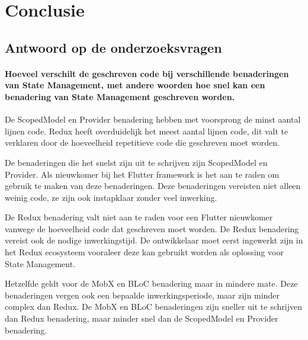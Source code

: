 
\chapter{Conclusie}
\label{ch:conclusie}


\section{Antwoord op de onderzoeksvragen}
\subsubsection{Hoeveel verschilt de geschreven code bij verschillende benaderingen van State Management, met andere woorden hoe snel kan een benadering van State Management geschreven worden.}
De ScopedModel en Provider benadering hebben met voorsprong de minst aantal lijnen code. Redux heeft overduidelijk het meest aantal lijnen code, dit valt te verklaren door de hoeveelheid repetitieve code die geschreven moet worden. 

De benaderingen die het snelst zijn uit te schrijven zijn ScopedModel en Provider. Als nieuwkomer bij het Flutter framework is het aan te raden om gebruik te maken van deze benaderingen. Deze benaderingen vereisten niet alleen weinig code, ze zijn ook instapklaar zonder veel inwerking.  

De Redux benadering valt niet aan te raden voor een Flutter nieuwkomer vanwege de hoeveelheid code dat geschreven moet worden. De Redux benadering vereist ook de nodige inwerkingstijd. De ontwikkelaar moet eerst ingewerkt zijn in het Redux ecosysteem vooraleer deze kan gebruikt worden als oplossing voor State Management. 

Hetzelfde geldt voor de MobX en BLoC benadering maar in mindere mate. Deze benaderingen vergen ook een bepaalde inwerkingsperiode, maar zijn minder complex dan Redux. De MobX en BLoC benaderingen zijn sneller uit te schrijven dan Redux benadering, maar minder snel dan de ScopedModel en Provider benadering.

